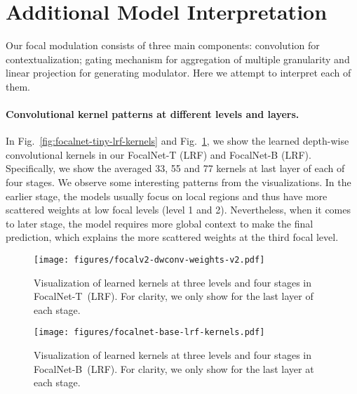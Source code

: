\documentclass{article}
\begin{document}
\section{Additional Model Interpretation}

Our focal modulation consists of three main components:  convolution for contextualization;  gating mechanism for aggregation of multiple granularity and  linear projection for generating modulator. Here we attempt to interpret each of them.

\paragraph{Convolutional kernel patterns at different levels and layers.} In Fig.~\ref{fig:focalnet-tiny-lrf-kernels} and Fig.~\ref{fig:focalnet-base-lrf-kernels}, we show the learned depth-wise convolutional kernels in our FocalNet-T (LRF) and FocalNet-B (LRF). Specifically, we show the averaged 33, 55 and 77 kernels at last layer of each of four stages. We observe some interesting patterns from the visualizations. In the earlier stage, the models usually focus on local regions and thus have more scattered weights at low focal levels (level 1 and 2). Nevertheless, when it comes to later stage, the model requires more global context to make the final prediction, which explains the more scattered weights at the third focal level.

\begin{figure}[t]
\begin{minipage}{0.48\linewidth}
	\centering
	\texttt{[image: figures/focalv2-dwconv-weights-v2.pdf]}
	\vspace{-3mm}
    \captionsetup{font=scriptsize}    
    \caption{Visualization of learned kernels at three levels and four stages in FocalNet-T~(LRF). For clarity, we only show for the last layer of each stage.}
    \label{fig:focalnet-tiny-lrf-kernels}
\end{minipage}
\quad
\begin{minipage}{0.48\linewidth}
	\centering
	\texttt{[image: figures/focalnet-base-lrf-kernels.pdf]}
	\vspace{-3mm}
    \captionsetup{font=scriptsize}    
    \caption{Visualization of learned kernels at three levels and four stages in FocalNet-B~(LRF). For clarity, we only show for the last layer at each stage.}
    \label{fig:focalnet-base-lrf-kernels}
\end{minipage}
\end{figure}
\end{document}
